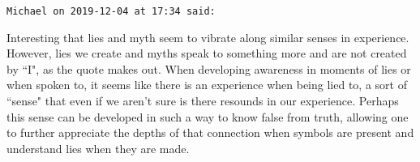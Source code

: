 \begin{footnotesize}
\begin{sffamily}
\hfill

\texttt{Michael on 2019-12-04 at 17:34 said: }

Interesting that lies and myth seem to vibrate along similar senses in experience. However, lies we create and myths speak to something more and are not created by ``I", as the quote makes out. When developing awareness in moments of lies or when spoken to, it seems like there is an experience when being lied to, a sort of ``sense" that even if we aren't sure is there resounds in our experience. Perhaps this sense can be developed in such a way to know false from truth, allowing one to further appreciate the depths of that connection when symbols are present and understand lies when they are made.


\end{sffamily}\end{footnotesize}
